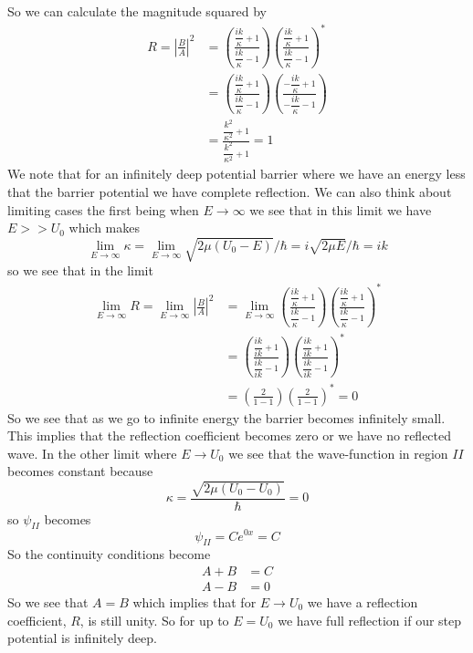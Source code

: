 \documentclass[11pt]{article}
\numberwithin{equation}{section}
\begin{document}
So we can calculate the magnitude squared by
\begin{align*}
R = \left|\frac{B}{A}\right|^2 &= \left(\frac{\dfrac{ik}{\kappa}+1}{\dfrac{ik}{\kappa}-1}\right)\left(\frac{\dfrac{ik}{\kappa}+1}{\dfrac{ik}{\kappa}-1}\right)^*\\
&= \left(\frac{\dfrac{ik}{\kappa}+1}{\dfrac{ik}{\kappa}-1}\right)\left(\frac{-\dfrac{ik}{\kappa}+1}{-\dfrac{ik}{\kappa}-1}\right)\\
&= \frac{\dfrac{k^2}{\kappa^2}+1}{\dfrac{k^2}{\kappa^2}+1} = 1
\end{align*}
We note that for an infinitely deep potential barrier where we have an energy less that the 
barrier potential we have complete reflection. We can also think about limiting cases the 
first being when $E\rightarrow\infty$ we see that in this limit we have $E>>U_0$ which makes
$$\lim_{E\rightarrow\infty}\kappa = \lim_{E\rightarrow\infty}\sqrt{2\mu(U_0-E)}/\hbar = i\sqrt{2\mu E}/\hbar = ik$$
so we see that in the limit
\begin{align*}
\lim_{E\rightarrow\infty} R =\lim_{E\rightarrow\infty} \left|\frac{B}{A}\right|^2 &= \lim_{E\rightarrow\infty}\left(\frac{\dfrac{ik}{\kappa}+1}{\dfrac{ik}{\kappa}-1}\right)\left(\frac{\dfrac{ik}{\kappa}+1}{\dfrac{ik}{\kappa}-1}\right)^*\\
&= \left(\frac{\dfrac{ik}{ik}+1}{\dfrac{ik}{ik}-1}\right)\left(\frac{\dfrac{ik}{ik}+1}{\dfrac{ik}{ik}-1}\right)^*\\
&= \left(\frac{2}{1-1}\right)\left(\frac{2}{1-1}\right)^* = 0
\end{align*}
So we see that as we go to infinite energy the barrier becomes infinitely small. This implies
that the reflection coefficient becomes zero or we have no reflected wave. In the other limit
where $E\rightarrow{U_0}$ we see that the wave-function in region $II$ becomes constant 
because 
$$\kappa = \frac{\sqrt{2\mu(U_0-U_0)}}{\hbar} = 0$$
so $\psi_{II}$ becomes
$$\psi_{II} = Ce^{0x} = C$$
So the continuity conditions become
\begin{align*}
A + B &= C\\
A - B &= 0
\end{align*}
So we see that $A=B$ which implies that for $E\rightarrow{U_0}$ we have a reflection 
coefficient, $R$, is still unity. So for up to $E=U_0$ we have full reflection if our step
potential is infinitely deep.

\pagebreak
\end{document}
